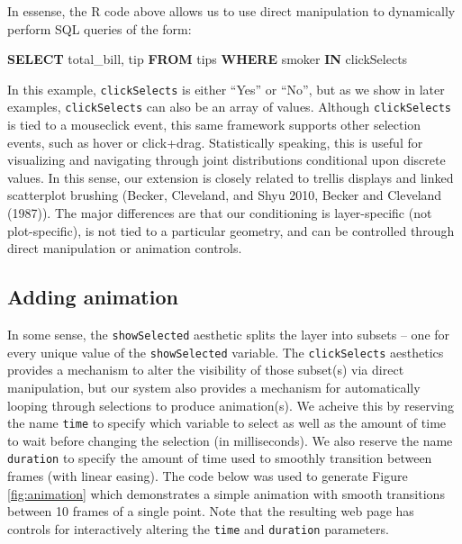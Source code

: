 \documentclass[12pt,]{article}
\newenvironment{Shaded}{\begin{snugshade}}{\end{snugshade}}
\newcommand{\KeywordTok}[1]{\textcolor[rgb]{0.13,0.29,0.53}{\textbf{#1}}}
\newcommand{\NormalTok}[1]{#1}
\theoremstyle{definition}
\theoremstyle{definition}
\theoremstyle{remark}
\begin{document}
In essense, the R code above allows us to use direct manipulation to
dynamically perform SQL queries of the form:

\begin{Shaded}
\begin{Highlighting}[]
\KeywordTok{SELECT}\NormalTok{ total_bill, tip }\KeywordTok{FROM}\NormalTok{ tips}
  \KeywordTok{WHERE}\NormalTok{ smoker }\KeywordTok{IN}\NormalTok{ clickSelects}
\end{Highlighting}
\end{Shaded}

In this example, \texttt{clickSelects} is either ``Yes'' or ``No'', but
as we show in later examples, \texttt{clickSelects} can also be an array
of values. Although \texttt{clickSelects} is tied to a mouseclick event,
this same framework supports other selection events, such as hover or
click+drag. Statistically speaking, this is useful for visualizing and
navigating through joint distributions conditional upon discrete values.
In this sense, our extension is closely related to trellis displays and
linked scatterplot brushing (Becker, Cleveland, and Shyu 2010, Becker
and Cleveland (1987)). The major differences are that our conditioning
is layer-specific (not plot-specific), is not tied to a particular
geometry, and can be controlled through direct manipulation or animation
controls.

\subsection{Adding animation}\label{animation}

In some sense, the \texttt{showSelected} aesthetic splits the layer into
subsets -- one for every unique value of the \texttt{showSelected}
variable. The \texttt{clickSelects} aesthetics provides a mechanism to
alter the visibility of those subset(s) via direct manipulation, but our
system also provides a mechanism for automatically looping through
selections to produce animation(s). We acheive this by reserving the
name \texttt{time} to specify which variable to select as well as the
amount of time to wait before changing the selection (in milliseconds).
We also reserve the name \texttt{duration} to specify the amount of time
used to smoothly transition between frames (with linear easing). The
code below was used to generate Figure \ref{fig:animation} which
demonstrates a simple animation with smooth transitions between 10
frames of a single point. Note that the resulting web page has controls
for interactively altering the \texttt{time} and \texttt{duration}
parameters.
\end{document}
